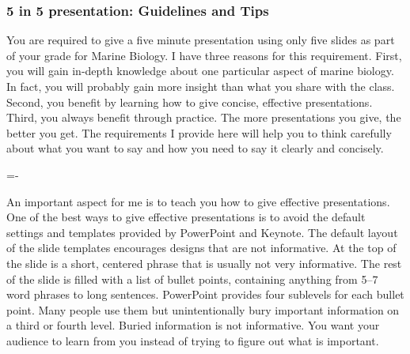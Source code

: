 \documentclass[letterpaper]{memoir}
\newcommand{\insertslide}[2]{%
  \framebox{\texttt{[image: \#2]}}
}
\begin{document}
\thispagestyle{plain}




\subsubsection*{5 in 5 presentation: Guidelines and Tips}

You are required to give a five minute presentation using only five slides as part of your grade for Marine Biology. I have three reasons for this requirement. First, you will gain in-depth knowledge about one particular aspect of marine biology. In fact, you will probably gain more insight than what you share with the class.  Second, you benefit by learning how to give concise, effective presentations. Third, you always benefit through practice. The more presentations you give, the better you get. The requirements I provide here will help you to think carefully about what you want to say and how you need to say it clearly and concisely.

{\sideparvshift=-\baselineskip\sidepar{\insertslide{1}{5_in_5_overview.pdf}}}

An important aspect for me is to teach you how to give effective presentations. One of the best ways to give effective presentations is to avoid the default settings and templates provided by PowerPoint and Keynote. The default layout of the slide templates encourages designs that are not informative. At the top of the slide is a short, centered phrase that is usually not very informative. The rest of the slide is filled with a list of bullet points, containing anything from 5--7 word phrases to long sentences. PowerPoint provides four sublevels for each bullet point. Many people use them but unintentionally bury important information on a third or fourth level. Buried information is not informative. You want your audience to learn from you instead of trying to figure out what is important.
\end{document}
